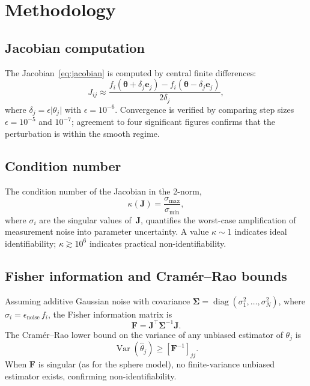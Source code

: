 \section{Methodology}\label{sec:methodology}

\subsection{Jacobian computation}

The Jacobian~\eqref{eq:jacobian} is computed by central finite differences:
\begin{equation}
  J_{ij}
  \approx \frac{f_i(\boldsymbol{\theta} + \delta_j \mathbf{e}_j)
              - f_i(\boldsymbol{\theta} - \delta_j \mathbf{e}_j)}
               {2 \delta_j},
\end{equation}
where $\delta_j = \epsilon \lvert \theta_j \rvert$ with $\epsilon = 10^{-6}$.
Convergence is verified by comparing step sizes $\epsilon = 10^{-5}$ and
$10^{-7}$; agreement to four significant figures confirms that the
perturbation is within the smooth regime.

\subsection{Condition number}

The condition number of the Jacobian in the 2-norm,
\begin{equation}
  \kappa(\mathbf{J}) = \frac{\sigma_\text{max}}{\sigma_\text{min}},
\end{equation}
where $\sigma_i$ are the singular values of~$\mathbf{J}$, quantifies the
worst-case amplification of measurement noise into parameter uncertainty.
A value $\kappa \sim 1$ indicates ideal identifiability;
$\kappa \gtrsim 10^6$ indicates practical non-identifiability.

\subsection{Fisher information and Cram\'er--Rao bounds}

Assuming additive Gaussian noise with covariance
$\boldsymbol{\Sigma} = \operatorname{diag}(\sigma_1^2, \dots, \sigma_N^2)$,
where $\sigma_i = \epsilon_\text{noise} \, f_i$, the Fisher information
matrix is
\begin{equation}\label{eq:fisher}
  \mathbf{F}
  = \mathbf{J}^\top \boldsymbol{\Sigma}^{-1} \mathbf{J}.
\end{equation}
The Cram\'er--Rao lower bound on the variance of any unbiased estimator of
$\theta_j$ is
\begin{equation}
  \operatorname{Var}(\hat\theta_j) \geq [\mathbf{F}^{-1}]_{jj}.
\end{equation}
When $\mathbf{F}$ is singular (as for the sphere model), no finite-variance
unbiased estimator exists, confirming non-identifiability.

